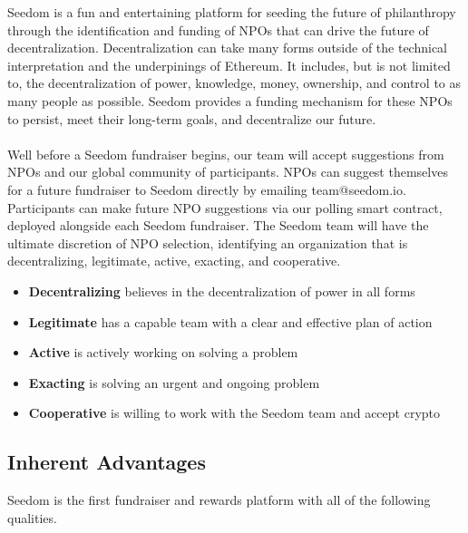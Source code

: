 \documentclass[11pt]{article}
\begin{document}
Seedom is a fun and entertaining platform for seeding the future of philanthropy through the identification and funding of NPOs that can drive the future of decentralization. Decentralization can take many forms outside of the technical interpretation and the underpinings of Ethereum. It includes, but is not limited to, the decentralization of power, knowledge, money, ownership, and control to as many people as possible. Seedom provides a funding mechanism for these NPOs to persist, meet their long-term goals, and decentralize our future.\\\\
Well before a Seedom fundraiser begins, our team will accept suggestions from NPOs and our global community of participants. NPOs can suggest themselves for a future fundraiser to Seedom directly by emailing team@seedom.io. Participants can make future NPO suggestions via our polling smart contract, deployed alongside each Seedom fundraiser. The Seedom team will have the ultimate discretion of NPO selection, identifying an organization that is decentralizing, legitimate, active, exacting, and cooperative.

\begin{itemize}
\item{\textbf{Decentralizing} believes in the decentralization of power in all forms}
\item{\textbf{Legitimate} has a capable team with a clear and effective plan of action}
\item{\textbf{Active} is actively working on solving a problem}
\item{\textbf{Exacting} is solving an urgent and ongoing problem}
\item{\textbf{Cooperative} is willing to work with the Seedom team and accept crypto}
\end{itemize}

\subsection{Inherent Advantages}

Seedom is the first fundraiser and rewards platform with all of the following qualities.
\end{document}
